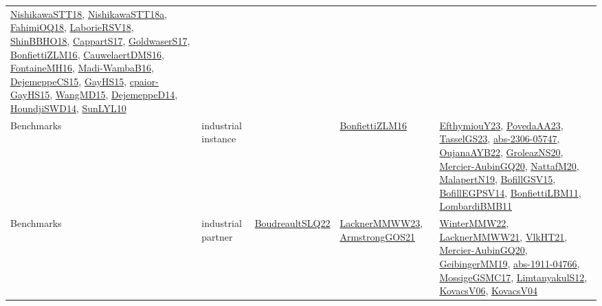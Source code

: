 {\begin{longtable}{lp{3cm}>{\raggedright}p{6cm}>{\raggedright}p{6cm}p{8cm}}
\href{papers/NishikawaSTT18.pdf}{NishikawaSTT18}\cite{NishikawaSTT18}, \href{papers/NishikawaSTT18a.pdf}{NishikawaSTT18a}\cite{NishikawaSTT18a}, \href{articles/FahimiOQ18.pdf}{FahimiOQ18}\cite{FahimiOQ18}, \href{articles/LaborieRSV18.pdf}{LaborieRSV18}\cite{LaborieRSV18}, \href{articles/ShinBBHO18.pdf}{ShinBBHO18}\cite{ShinBBHO18}, \href{papers/CappartS17.pdf}{CappartS17}\cite{CappartS17}, \href{papers/GoldwaserS17.pdf}{GoldwaserS17}\cite{GoldwaserS17}, \href{papers/BonfiettiZLM16.pdf}{BonfiettiZLM16}\cite{BonfiettiZLM16}, \href{papers/CauwelaertDMS16.pdf}{CauwelaertDMS16}\cite{CauwelaertDMS16}, \href{papers/FontaineMH16.pdf}{FontaineMH16}\cite{FontaineMH16}, \href{papers/Madi-WambaB16.pdf}{Madi-WambaB16}\cite{Madi-WambaB16}, \href{papers/DejemeppeCS15.pdf}{DejemeppeCS15}\cite{DejemeppeCS15}, \href{papers/GayHS15.pdf}{GayHS15}\cite{GayHS15}, \href{papers/cpaior-GayHS15.pdf}{cpaior-GayHS15}\cite{cpaior-GayHS15}, \href{articles/WangMD15.pdf}{WangMD15}\cite{WangMD15}, \href{papers/DejemeppeD14.pdf}{DejemeppeD14}\cite{DejemeppeD14}, \href{papers/HoundjiSWD14.pdf}{HoundjiSWD14}\cite{HoundjiSWD14}, \href{papers/SunLYL10.pdf}{SunLYL10}\cite{SunLYL10}\\
Benchmarks & industrial instance &  & \href{papers/BonfiettiZLM16.pdf}{BonfiettiZLM16}\cite{BonfiettiZLM16} & \href{papers/EfthymiouY23.pdf}{EfthymiouY23}\cite{EfthymiouY23}, \href{papers/PovedaAA23.pdf}{PovedaAA23}\cite{PovedaAA23}, \href{papers/TasselGS23.pdf}{TasselGS23}\cite{TasselGS23}, \href{articles/abs-2306-05747.pdf}{abs-2306-05747}\cite{abs-2306-05747}, \href{papers/OujanaAYB22.pdf}{OujanaAYB22}\cite{OujanaAYB22}, \href{papers/GroleazNS20.pdf}{GroleazNS20}\cite{GroleazNS20}, \href{papers/Mercier-AubinGQ20.pdf}{Mercier-AubinGQ20}\cite{Mercier-AubinGQ20}, \href{papers/NattafM20.pdf}{NattafM20}\cite{NattafM20}, \href{papers/MalapertN19.pdf}{MalapertN19}\cite{MalapertN19}, \href{papers/BofillGSV15.pdf}{BofillGSV15}\cite{BofillGSV15}, \href{papers/BofillEGPSV14.pdf}{BofillEGPSV14}\cite{BofillEGPSV14}, \href{papers/BonfiettiLBM11.pdf}{BonfiettiLBM11}\cite{BonfiettiLBM11}, \href{papers/LombardiBMB11.pdf}{LombardiBMB11}\cite{LombardiBMB11}\\
Benchmarks & industrial partner & \href{papers/BoudreaultSLQ22.pdf}{BoudreaultSLQ22}\cite{BoudreaultSLQ22} & \href{articles/LacknerMMWW23.pdf}{LacknerMMWW23}\cite{LacknerMMWW23}, \href{papers/ArmstrongGOS21.pdf}{ArmstrongGOS21}\cite{ArmstrongGOS21} & \href{papers/WinterMMW22.pdf}{WinterMMW22}\cite{WinterMMW22}, \href{papers/LacknerMMWW21.pdf}{LacknerMMWW21}\cite{LacknerMMWW21}, \href{articles/VlkHT21.pdf}{VlkHT21}\cite{VlkHT21}, \href{papers/Mercier-AubinGQ20.pdf}{Mercier-AubinGQ20}\cite{Mercier-AubinGQ20}, \href{papers/GeibingerMM19.pdf}{GeibingerMM19}\cite{GeibingerMM19}, \href{articles/abs-1911-04766.pdf}{abs-1911-04766}\cite{abs-1911-04766}, \href{papers/MossigeGSMC17.pdf}{MossigeGSMC17}\cite{MossigeGSMC17}, \href{articles/LimtanyakulS12.pdf}{LimtanyakulS12}\cite{LimtanyakulS12}, \href{papers/KovacsV06.pdf}{KovacsV06}\cite{KovacsV06}, \href{papers/KovacsV04.pdf}{KovacsV04}\cite{KovacsV04}\\

\end{longtable}}
